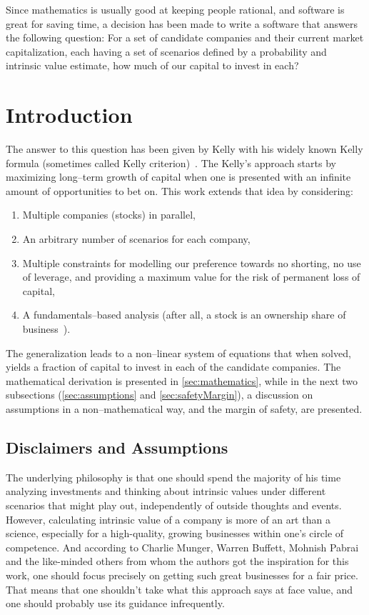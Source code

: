 \documentclass{article}
\begin{document}
Since mathematics is usually good at keeping people rational, and software is
great for saving time, a decision has been made to write a software that answers
the following question: For a set of candidate companies and their current
market capitalization, each having a set of scenarios defined by a probability
and intrinsic value estimate, how much of our capital to invest in each?

\section{Introduction}
\label{sec:introduction}

The answer to this question has been given by Kelly with his widely known Kelly
formula (sometimes called Kelly criterion)~\cite{kelly}. The Kelly's approach
starts by maximizing long--term growth of capital when one is presented with
an infinite amount of opportunities to bet on. This work extends that idea by
considering:
\begin{enumerate}
    \item Multiple companies (stocks) in parallel,
    \item An arbitrary number of scenarios for each company,
    \item Multiple constraints for modelling our preference towards no shorting,
    no use of leverage, and providing a maximum value for the risk of permanent
    loss of capital,
    \item A fundamentals--based analysis (after all, a stock is an ownership
    share of business~\cite{intelligentInvestor}).
\end{enumerate}

The generalization leads to a non--linear system of equations that when solved,
yields a fraction of capital to invest in each of the candidate companies. The
mathematical derivation is presented in \autoref{sec:mathematics}, while in the
next two subsections (\autoref{sec:assumptions} and \autoref{sec:safetyMargin}),
a discussion on assumptions in a non--mathematical way, and the margin of
safety, are presented.

\subsection{Disclaimers and Assumptions}
\label{sec:assumptions}

The underlying philosophy is that one should spend the majority of his time
analyzing investments and thinking about intrinsic values under different
scenarios that might play out, independently of outside thoughts and events.
However, calculating intrinsic value of a company is more of an art than a
science, especially for a high-quality, growing businesses within one's circle
of competence. And according to Charlie Munger, Warren Buffett, Mohnish Pabrai
and the like-minded others from whom the authors got the inspiration for this
work, one should focus precisely on getting such great businesses for a fair
price. That means that one shouldn't take what this approach says at face value,
and one should probably use its guidance infrequently.
\end{document}
